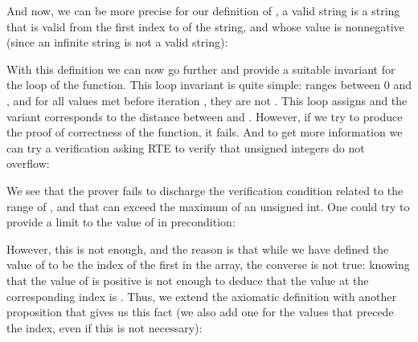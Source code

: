


And now, we can be more precise for our definition of
, a valid string is a
string that is valid from the first index to 
of the string, and whose value is nonnegative (since an
infinite string is not a valid string):








With this definition we can now go further and provide a suitable
invariant for the loop of the  function. This loop invariant is quite
simple:  ranges between 0 and , and for
all values met before iteration , they are not
. This loop assigns  and
the variant corresponds to the distance between  and
. However, if we try to produce the proof of
correctness of the function, it fails. And to get more information
we can try a verification asking RTE to verify that unsigned
integers do not overflow:






We see that the prover fails to discharge the verification condition
related to the range of , and that
 can exceed the maximum of an unsigned int. One could try
to provide a limit to the value of  in precondition:






However, this is not enough, and the reason is that while we have defined
the value of  to be the index of
the first  in the array, the converse is
not true: knowing that the value of  is positive
is not enough to deduce that the value at the corresponding index is
. Thus, we extend the axiomatic definition
with another proposition that gives us this fact (we also add one for the
values that precede the  index, even if this is
not necessary):







